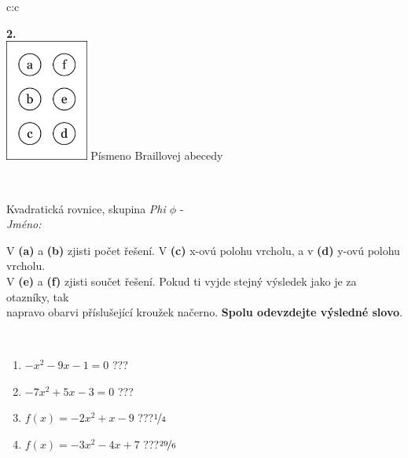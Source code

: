 \documentclass[10pt]{report}
\begin{document}
\begin{tabular}{c:c}
\begin{minipage}[c][104.5mm][t]{0.5\linewidth}
\begin{center}
\begin{minipage}{0.20\linewidth}
\begin{center}
{\Huge\bfseries 2.} \\[2mm]
\includegraphics[height=40mm]{../images/braille.png}
{\small Písmeno Braillovej abecedy}
\end{center}
\end{minipage}
\end{center}
\end{minipage}
\\ \hdashline
\begin{minipage}[c][104.5mm][t]{0.5\linewidth}
\begin{center}
\vspace{7mm}
{\huge Kvadratická rovnice, skupina \textit{Phi $\phi$} -}\\[5mm]
\textit{Jméno:}\phantom{xxxxxxxxxxxxxxxxxxxxxxxxxxxxxxxxxxxxxxxxxxxxxxxxxxxxxxxxxxxxxxxxx}\\[5mm]
\begin{minipage}{0.95\linewidth}
\begin{center}
V \textbf{(a)} a \textbf{(b)} zjisti počet řešení. V \textbf{(c)} x-ovú polohu vrcholu, a v \textbf{(d)} y-ovú polohu vrcholu.\\V \textbf{(e)} a \textbf{(f)} zjisti součet řešení. Pokud ti vyjde stejný výsledek jako je za otazníky, tak\\napravo obarvi příslušející kroužek načerno. \textbf{Spolu odevzdejte výsledné slovo}.
\end{center}
\end{minipage}
\\[1mm]
\begin{minipage}{0.79\linewidth}
\begin{center}
\begin{varwidth}{\linewidth}
\begin{enumerate}
\Large
\item $-x^2-9x-1=0$\quad \dotfill\; ???\;\dotfill {}
\item $-7x^2+5x-3=0$\quad \dotfill\; ???\;\dotfill {}
\item $f(x)=-2x^2+x-9$\quad \dotfill\; ???\;\dotfill \quad $\nicefrac{1}{4}$
\item $f(x)=-3x^2-4x+7$\quad \dotfill\; ???\;\dotfill \quad $\nicefrac{29}{6}$

\end{enumerate}
\end{varwidth}
\end{center}
\end{minipage}
\end{center}
\end{minipage}
\end{tabular}
\end{document}
